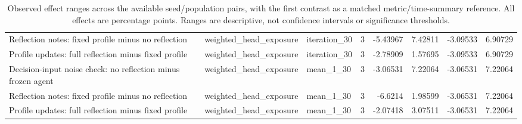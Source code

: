 \begin{table}[htbp!]
\begin{tabular}{lllrrrrr}
Reflection notes: fixed profile minus no reflection & weighted\_head\_exposure & iteration\_30 & 3 & -5.43967 & 7.42811 & -3.09533 & 6.90729 \\
Profile updates: full reflection minus fixed profile & weighted\_head\_exposure & iteration\_30 & 3 & -2.78909 & 1.57695 & -3.09533 & 6.90729 \\
Decision-input noise check: no reflection minus frozen agent & weighted\_head\_exposure & mean\_1\_30 & 3 & -3.06531 & 7.22064 & -3.06531 & 7.22064 \\
Reflection notes: fixed profile minus no reflection & weighted\_head\_exposure & mean\_1\_30 & 3 & -6.6214 & 1.98599 & -3.06531 & 7.22064 \\
Profile updates: full reflection minus fixed profile & weighted\_head\_exposure & mean\_1\_30 & 3 & -2.07418 & 3.07511 & -3.06531 & 7.22064 \\
\hline
\end{tabular}
\caption{Observed effect ranges across the available seed/population pairs, with the first contrast as a matched metric/time-summary reference. All effects are percentage points. Ranges are descriptive, not confidence intervals or significance thresholds.}
\label{chap:results:tab:rq3_effect_ranges_and_noise_reference}
\end{table}
